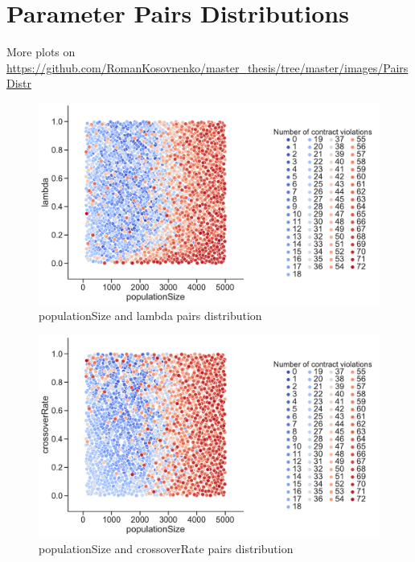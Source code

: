 \chapter{Parameter Pairs Distributions}\label{appendix:Distributions1}
More plots on \url{https://github.com/RomanKosovnenko/master_thesis/tree/master/images/PairsDistr}
\begin{figure}[!htb]
	\centering
	\includegraphics[width=\textwidth]{images/PairsDistr/populationSize_lambda.pdf}
	\caption[]{populationSize and lambda pairs distribution}
	\label{fig:populationSize_lambda_pair}
\end{figure}
\begin{figure}
	\centering
	\includegraphics[width=\textwidth]{images/PairsDistr/populationSize_crossoverRate.pdf}
	\caption[]{populationSize and crossoverRate pairs distribution}
	\label{fig:populationSize_crossoverRate_pair}
\end{figure}

